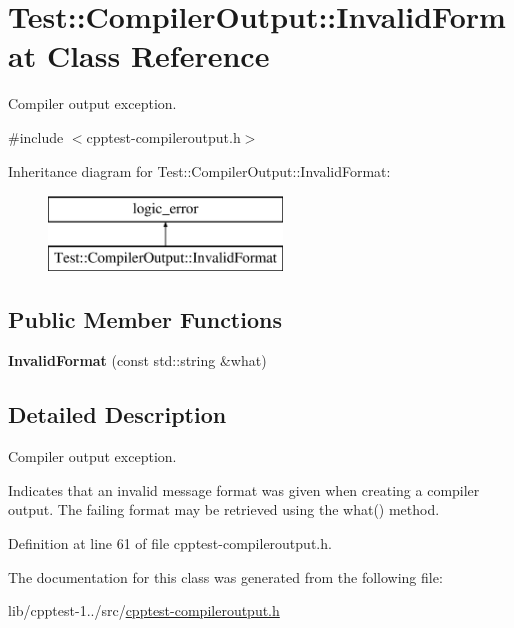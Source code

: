 \hypertarget{class_test_1_1_compiler_output_1_1_invalid_format}{}\section{Test\+:\+:Compiler\+Output\+:\+:Invalid\+Format Class Reference}
\label{class_test_1_1_compiler_output_1_1_invalid_format}


Compiler output exception.  




{\ttfamily \#include $<$cpptest-\/compileroutput.\+h$>$}

Inheritance diagram for Test\+:\+:Compiler\+Output\+:\+:Invalid\+Format\+:\begin{figure}[H]
\begin{center}
\leavevmode
\includegraphics[height=2.000000cm]{class_test_1_1_compiler_output_1_1_invalid_format}
\end{center}
\end{figure}
\subsection*{Public Member Functions}
\begin{DoxyCompactItemize}
\item 
{\bfseries Invalid\+Format} (const std\+::string \&what)\hypertarget{class_test_1_1_compiler_output_1_1_invalid_format_a3a7ab44239805bcefd4bc19c48c91992}{}\label{class_test_1_1_compiler_output_1_1_invalid_format_a3a7ab44239805bcefd4bc19c48c91992}

\end{DoxyCompactItemize}


\subsection{Detailed Description}
Compiler output exception. 

Indicates that an invalid message format was given when creating a compiler output. The failing format may be retrieved using the what() method. 

Definition at line 61 of file cpptest-\/compileroutput.\+h.



The documentation for this class was generated from the following file\+:\begin{DoxyCompactItemize}
\item 
lib/cpptest-\/1../src/\hyperlink{cpptest-compileroutput_8h}{cpptest-\/compileroutput.\+h}\end{DoxyCompactItemize}
